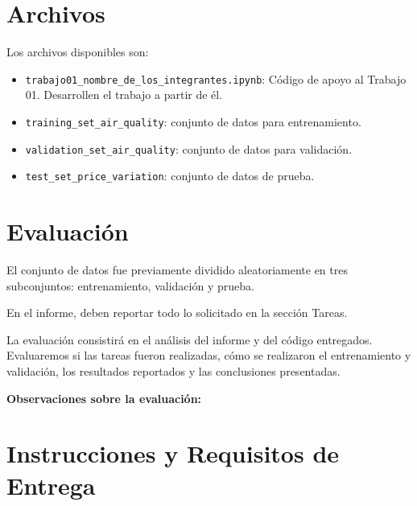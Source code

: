 \section{Archivos}

Los archivos disponibles son:

\begin{itemize}
    \item \texttt{trabajo01\_nombre\_de\_los\_integrantes.ipynb}: Código de apoyo al Trabajo 01. Desarrollen el trabajo a partir de él.
    \item \texttt{training\_set\_air\_quality}: conjunto de datos para entrenamiento.
    \item \texttt{validation\_set\_air\_quality}: conjunto de datos para validación.
    \item \texttt{test\_set\_price\_variation}: conjunto de datos de prueba.
\end{itemize}

\section{Evaluación}

El conjunto de datos fue previamente dividido aleatoriamente en tres subconjuntos: entrenamiento, validación y prueba.

En el informe, deben reportar todo lo solicitado en la sección Tareas.

La evaluación consistirá en el análisis del informe y del código entregados. Evaluaremos si las tareas fueron realizadas, cómo se realizaron el entrenamiento y validación, los resultados reportados y las conclusiones presentadas.

\textbf{Observaciones sobre la evaluación:}

\section*{Instrucciones y Requisitos de Entrega}

